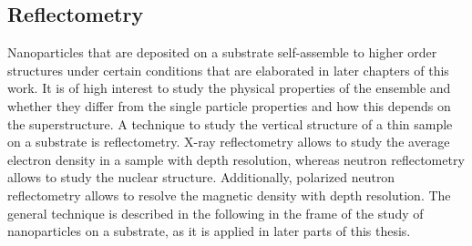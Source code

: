 \documentclass[\main/dresen_thesis.tex]{subfiles}
\begin{document}
  \subsection{Reflectometry}\label{sec:theoreticalBackground:scattering:reflectometry}
    Nanoparticles that are deposited on a substrate self-assemble to higher order structures under certain conditions that are elaborated in later chapters of this work.
    It is of high interest to study the physical properties of the ensemble and whether they differ from the single particle properties and how this depends on the superstructure.
    A technique to study the vertical structure of a thin sample on a substrate is reflectometry.
    X-ray reflectometry allows to study the average electron density in a sample with depth resolution, whereas neutron reflectometry allows to study the nuclear structure.
    Additionally, polarized neutron reflectometry allows to resolve the magnetic density with depth resolution.
    The general technique is described in the following in the frame of the study of nanoparticles on a substrate, as it is applied in later parts of this thesis.
\end{document}
